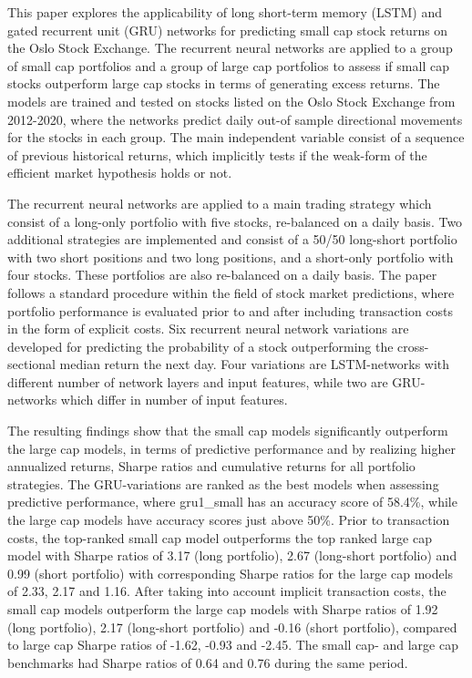 This paper explores the applicability of long short-term memory (LSTM) and gated recurrent unit (GRU) networks for predicting small cap stock returns on the Oslo Stock Exchange. The recurrent neural networks are applied to a group of small cap portfolios  and a group of large cap portfolios to assess if small cap stocks outperform large cap stocks in terms of generating excess returns. The models are trained and tested on stocks listed on the Oslo Stock Exchange from 2012-2020, where the networks predict daily out-of sample directional movements for the stocks in each group. The main independent variable consist of a sequence of previous historical returns, which implicitly tests if the weak-form of the efficient market hypothesis holds or not. 

\indent\newline
The recurrent neural networks are applied to a main trading strategy which consist of a long-only portfolio with five stocks, re-balanced on a daily basis. Two additional strategies are implemented and consist of a 50/50 long-short portfolio with two short positions and two long positions, and a short-only portfolio with four stocks. These portfolios are also re-balanced on a daily basis. The paper follows a standard procedure within the field of stock market predictions, where portfolio performance is evaluated prior to and after including transaction costs in the form of explicit costs. Six recurrent neural network variations are developed for predicting the probability of a stock outperforming the cross-sectional median return the next day. Four variations are LSTM-networks with different number of network layers and input features, while two are GRU-networks which differ in number of input features. 

\indent\newline
The resulting findings show that the small cap models significantly outperform the large cap models, in terms of predictive performance and by realizing higher annualized returns, Sharpe ratios and cumulative returns for all portfolio strategies. The GRU-variations are ranked as the best models when assessing predictive performance, where gru1\_small has an accuracy score of 58.4\%, while the large cap models have accuracy scores just above 50\%. Prior to transaction costs, the top-ranked small cap model outperforms the top ranked large cap model with Sharpe ratios of 3.17 (long portfolio), 2.67 (long-short portfolio) and 0.99 (short portfolio) with corresponding Sharpe ratios for the large cap models of 2.33, 2.17 and 1.16. After taking into account implicit transaction costs, the small cap models outperform the large cap models with Sharpe ratios of 1.92 (long portfolio), 2.17 (long-short portfolio) and -0.16 (short portfolio), compared to large cap Sharpe ratios of -1.62, -0.93 and -2.45. The small cap- and large cap benchmarks had Sharpe ratios of 0.64 and 0.76 during the same period.

